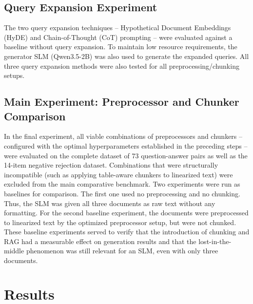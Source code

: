 \documentclass[12pt]{article} %
\begin{document}
\subsection{Query Expansion Experiment}
The two query expansion techniques -- Hypothetical Document Embeddings (HyDE) and Chain-of-Thought (CoT) prompting -- were evaluated against a baseline without query expansion. To maintain low resource requirements, the generator SLM (Qwen3.5-2B) was also used to generate the expanded queries. All three query expansion methods were also tested for all preprocessing/chunking setups.

\subsection{Main Experiment: Preprocessor and Chunker Comparison}
In the final experiment, all viable combinations of preprocessors and chunkers -- configured with the optimal hyperparameters established in the preceding steps -- were evaluated on the complete dataset of 73 question-answer pairs as well as the 14-item negative rejection dataset.
Combinations that were structurally incompatible (such as applying table-aware chunkers to linearized text) were excluded from the main comparative benchmark.
Two experiments were run as baselines for comparison. The first one used no preprocessing and no chunking. Thus, the SLM was given all three documents as raw text without any formatting.
For the second baseline experiment, the documents were preprocessed to linearized text by the optimized preprocessor setup, but were not chunked. These baseline experiments served to verify that the introduction of chunking and RAG had a measurable effect on generation results and that the lost-in-the-middle phenomenon was still relevant for an SLM, even with only three documents.
\section{Results}
\end{document}
